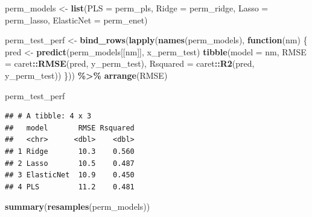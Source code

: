 \documentclass[
  11pt,
]{article}
\newenvironment{Shaded}{\begin{snugshade}}{\end{snugshade}}
\newcommand{\AttributeTok}[1]{\textcolor[rgb]{0.13,0.29,0.53}{#1}}
\newcommand{\ControlFlowTok}[1]{\textcolor[rgb]{0.13,0.29,0.53}{\textbf{#1}}}
\newcommand{\FunctionTok}[1]{\textcolor[rgb]{0.13,0.29,0.53}{\textbf{#1}}}
\newcommand{\NormalTok}[1]{#1}
\newcommand{\OtherTok}[1]{\textcolor[rgb]{0.56,0.35,0.01}{#1}}
\newcommand{\SpecialCharTok}[1]{\textcolor[rgb]{0.81,0.36,0.00}{\textbf{#1}}}
\begin{document}
\begin{Shaded}
\begin{Highlighting}[]
\NormalTok{perm\_models }\OtherTok{\textless{}{-}} \FunctionTok{list}\NormalTok{(}\AttributeTok{PLS =}\NormalTok{ perm\_pls, }\AttributeTok{Ridge =}\NormalTok{ perm\_ridge, }\AttributeTok{Lasso =}\NormalTok{ perm\_lasso, }\AttributeTok{ElasticNet =}\NormalTok{ perm\_enet)}

\NormalTok{perm\_test\_perf }\OtherTok{\textless{}{-}} \FunctionTok{bind\_rows}\NormalTok{(}\FunctionTok{lapply}\NormalTok{(}\FunctionTok{names}\NormalTok{(perm\_models), }\ControlFlowTok{function}\NormalTok{(nm) \{}
\NormalTok{  pred }\OtherTok{\textless{}{-}} \FunctionTok{predict}\NormalTok{(perm\_models[[nm]], x\_perm\_test)}
  \FunctionTok{tibble}\NormalTok{(}\AttributeTok{model =}\NormalTok{ nm,}
         \AttributeTok{RMSE =}\NormalTok{ caret}\SpecialCharTok{::}\FunctionTok{RMSE}\NormalTok{(pred, y\_perm\_test),}
         \AttributeTok{Rsquared =}\NormalTok{ caret}\SpecialCharTok{::}\FunctionTok{R2}\NormalTok{(pred, y\_perm\_test))}
\NormalTok{\})) }\SpecialCharTok{\%\textgreater{}\%} \FunctionTok{arrange}\NormalTok{(RMSE)}

\NormalTok{perm\_test\_perf}
\end{Highlighting}
\end{Shaded}

\begin{verbatim}
## # A tibble: 4 x 3
##   model       RMSE Rsquared
##   <chr>      <dbl>    <dbl>
## 1 Ridge       10.3    0.560
## 2 Lasso       10.5    0.487
## 3 ElasticNet  10.9    0.450
## 4 PLS         11.2    0.481
\end{verbatim}

\begin{Shaded}
\begin{Highlighting}[]
\FunctionTok{summary}\NormalTok{(}\FunctionTok{resamples}\NormalTok{(perm\_models))}
\end{Highlighting}
\end{Shaded}
\end{document}
